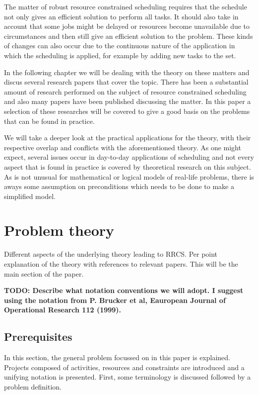 \documentclass{article}
\newcommand{\TODO}[1]{{\color{red}\textbf{TODO: #1}}}
\begin{document}
The matter of robust resource constrained scheduling requires that the schedule not only gives an efficient solution to perform all tasks. It  should also take in account that some jobs might be delayed or resources become unavailable due to circumstances and then still give an efficient solution to the problem. These kinds of changes can also occur due to the continuous nature of the application in which the scheduling is applied, for example by adding new tasks to the set.

In the following chapter we will be dealing with the theory on these matters and discus several research papers that cover the topic. There has been a substantial amount of research performed on the subject of resource constrained scheduling and also many papers have been published discussing the matter. In this paper a selection of these researches will be covered to give a good basis on the problems that can be found in practice.

We will take a deeper look at the practical applications for the theory, with their respective overlap and conflicts with the aforementioned theory. As one might expect, several issues occur in day-to-day applications of scheduling and not every aspect that is found in practice is covered by theoretical research on this subject. As is not unusual for mathematical or logical models of real-life problems, there is aways some assumption on preconditions which needs to be done to make a simplified model.

\newpage

\section{Problem theory}

Different aspects of the underlying theory leading to RRCS.  Per point explanation of the theory with references to relevant papers. This will be the main section of the paper.

\TODO{Describe what notation conventions we will adopt. I suggest using the notation from P. Brucker et al, Eauropean Journal of Operational Research 112 (1999). }

\subsection{Prerequisites}
In this section, the general problem focussed on in this paper is explained. Projects composed of activities, resources and constraints are introduced and a unifying notation is presented. First, some terminology is discussed followed by a problem definition.
\end{document}
